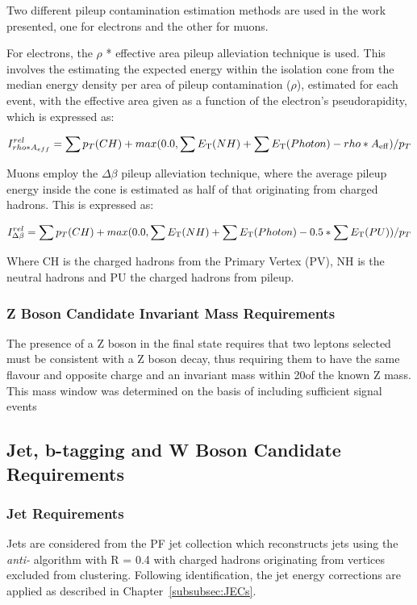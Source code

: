 Two different pileup contamination estimation methods are used in the work presented, one for electrons and the other for muons.

For electrons, the $\rho$ * effective area pileup alleviation technique is used.
This involves the estimating the expected energy within the isolation cone from the median energy density per area of pileup contamination ($\rho$), estimated for each event, with the effective area given as a function of the electron's pseudorapidity, which is expressed as: 

\begin{equation}
I^{rel}_{rho * A_{eff}} = \sum p_T(CH) + max (0.0, \sum E_{\rm T}(NH) + \sum E_{\rm T}(Photon) -rho*A_{\rm eff} )/p_T \\
\end{equation}\label{eq:rhoEffA}

Muons employ the $\Delta\beta$ pileup alleviation technique, where the average pileup energy inside the cone is estimated as half of that originating from charged hadrons.
This is expressed as:

\begin{equation}
I^{rel}_{\Delta\beta} = \sum p_T(CH) + max (0.0, \sum E_{\rm T}(NH) + \sum E_{\rm T}(Photon) - 0.5 * \sum E_{\rm T}(PU))/p_T \\
\end{equation}\label{eq:deltaBeta}

Where CH is the charged hadrons from the Primary Vertex (PV), NH is the neutral hadrons and PU the charged hadrons from pileup.

\subsubsection{Z Boson Candidate Invariant Mass Requirements}
The presence of a Z boson in the final state requires that two leptons selected must be consistent with a Z boson decay, thus requiring them to have the same flavour and opposite charge and an invariant mass within 20\GeVcc of the known Z mass.
This mass window was determined on the basis of including sufficient signal events 

\subsection{Jet, b-tagging and W Boson Candidate Requirements}
\subsubsection{Jet Requirements}
Jets are considered from the PF jet collection which reconstructs jets using the \emph{anti-\kt} algorithm with R = 0.4 with charged hadrons originating from \PU vertices excluded from clustering.
Following identification, the jet energy corrections are applied as described in Chapter~\ref{subsubsec:JECs}.

